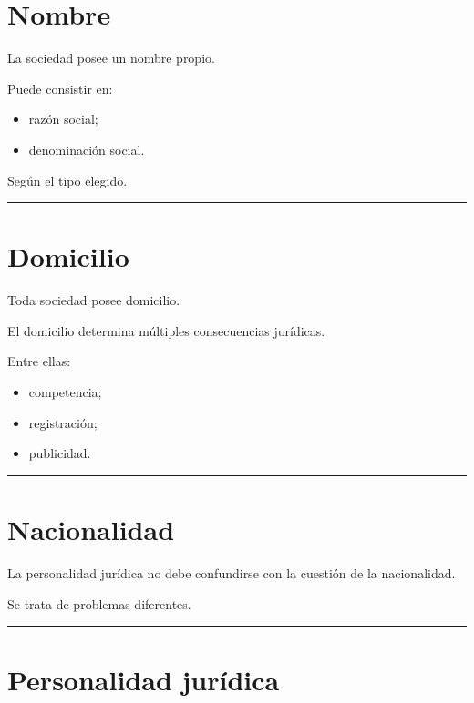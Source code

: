 \documentclass[
  spanish,
  letterpaper,
  DIV=11,
  numbers=noendperiod]{scrartcl}
\providecommand{\tightlist}{%
  \setlength{\itemsep}{0pt}\setlength{\parskip}{0pt}}
\begin{document}
\section{Nombre}\label{nombre}

La sociedad posee un nombre propio.

Puede consistir en:

\begin{itemize}
\tightlist
\item
  razón social;
\item
  denominación social.
\end{itemize}

Según el tipo elegido.

\begin{center}\rule{0.5\linewidth}{0.5pt}\end{center}

\section{Domicilio}\label{domicilio}

Toda sociedad posee domicilio.

El domicilio determina múltiples consecuencias jurídicas.

Entre ellas:

\begin{itemize}
\tightlist
\item
  competencia;
\item
  registración;
\item
  publicidad.
\end{itemize}

\begin{center}\rule{0.5\linewidth}{0.5pt}\end{center}

\section{Nacionalidad}\label{nacionalidad}

La personalidad jurídica no debe confundirse con la cuestión de la
nacionalidad.

Se trata de problemas diferentes.

\begin{center}\rule{0.5\linewidth}{0.5pt}\end{center}

\section{Personalidad jurídica}\label{personalidad-juruxeddica}
\end{document}
